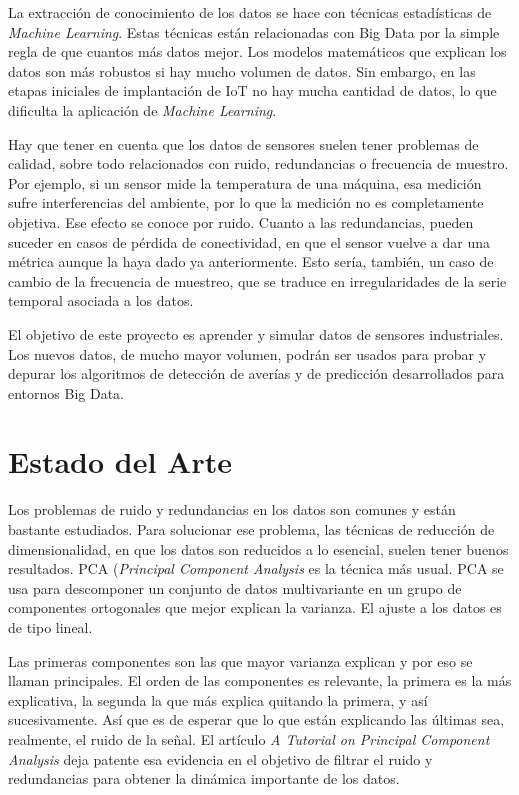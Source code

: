 \documentclass[11pt,spanish,listoffigures,listoftables]{tfgetsinf}
\begin{document}
La extracción de conocimiento de los datos se hace con técnicas estadísticas de {\em Machine Learning}. Estas técnicas están relacionadas con Big Data por la simple regla de que cuantos más datos mejor. Los modelos matemáticos que explican los datos son más robustos si hay mucho volumen de datos. Sin embargo, en las etapas iniciales de implantación de IoT no hay mucha cantidad de datos, lo que dificulta la aplicación de {\em Machine Learning}.

Hay que tener en cuenta que los datos de sensores suelen tener problemas de calidad, sobre todo relacionados con ruido, redundancias o frecuencia de muestro. Por ejemplo, si un sensor mide la temperatura de una máquina, esa medición sufre interferencias del ambiente, por lo que la medición no es completamente objetiva. Ese efecto se conoce por ruido. Cuanto a las redundancias, pueden suceder en casos de pérdida de conectividad, en que el sensor vuelve a dar una métrica aunque la haya dado ya anteriormente. Esto sería, también, un caso de cambio de la frecuencia de muestreo, 	que se traduce en irregularidades de la serie temporal asociada a los datos. 

El objetivo de este proyecto es aprender y simular datos de sensores industriales. Los nuevos datos, de mucho mayor volumen, podrán ser usados para probar y depurar los algoritmos de detección de averías y de predicción desarrollados para entornos Big Data. 

\chapter{Estado del Arte}
Los problemas de ruido y redundancias en los datos son comunes y están bastante estudiados. Para solucionar ese problema, las técnicas de reducción de dimensionalidad, en que los datos son reducidos a lo esencial, suelen tener buenos resultados. PCA ({\em Principal Component Analysis} es la técnica más usual. PCA se usa para descomponer un conjunto de datos multivariante en un grupo de componentes ortogonales que mejor explican la varianza. El ajuste a los datos es de tipo lineal.

Las primeras componentes son las que mayor varianza explican y por eso se llaman principales. El orden de las componentes es relevante, la primera es la más explicativa, la segunda la que más explica quitando la primera, y así sucesivamente. Así que es de esperar que lo que están explicando las últimas sea, realmente, el ruido de la señal. El artículo \textit{A Tutorial on Principal Component Analysis} \cite{shlens} deja patente esa evidencia en el objetivo de filtrar el ruido y redundancias para obtener la dinámica importante de los datos.
\end{document}
